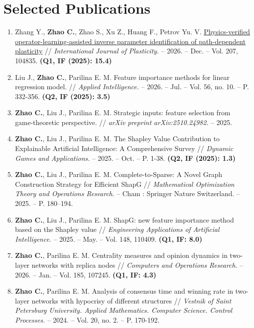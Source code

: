 \documentclass[letterpaper,10pt]{article}
\begin{document}
\section{Selected Publications}
\begin{enumerate}[itemsep=2pt,parsep=0pt]
  \fontsize{10}{10.5}\selectfont
  \item Zhang Y., \textbf{Zhao C.}, Zhao S., Xu Z., Huang F., Petrov Yu. V.
        \href{https://doi.org/10.1016/j.ijplas.2026.104835}{Physics-verified
        operator-learning-assisted inverse parameter identification of
        path-dependent plasticity} // {\it International Journal of
        Plasticity.} -- 2026. -- Dec. -- Vol. 207, 104835. {\bf (Q1, IF (2025):
        15.4)}
  \item Liu J., \textbf{Zhao C.}, Parilina E. M. Feature importance methods for
        linear regression model. // {\it Applied Intelligence.} -- 2026. --
        Jul. -- Vol. 56, no. 10. -- P. 332-356. {\bf (Q2, IF (2025): 3.5)}
  \item \textbf{Zhao C.}, Liu J., Parilina E. M. Strategic inputs: feature selection from game-theoretic perspective. // {\it arXiv preprint arXiv:2510.24982.} -- 2025.
  \item \textbf{Zhao C.}, Liu J., Parilina E. M. The Shapley Value Contribution to Explainable Artificial Intelligence: A Comprehensive Survey // {\it Dynamic Games and Applications.} -- 2025. -- Oct. -- P. 1-38. {\bf (Q2, IF (2025): 1.3)}
  \item \textbf{Zhao C.}, Liu J., Parilina E. M. Complete-to-Sparse: A Novel Graph Construction Strategy for Efficient ShapG // {\it Mathematical Optimization Theory and Operations Research}. -- Cham : Springer Nature Switzerland. -- 2025. -- P. 180–194.
  \item \textbf{Zhao C.}, Liu J., Parilina E. M. ShapG: new feature importance method based on the Shapley value // {\it Engineering Applications of Artificial Intelligence.} -- 2025. -- May. -- Vol. 148, 110409. {\bf (Q1, IF: 8.0)}
  \item \textbf{Zhao C.}, Parilina E. M. Centrality measures and opinion dynamics in two-layer networks with replica nodes // {\it Computers and Operations Research.} -- 2026. -- Jan. -- Vol. 185, 107245. {\bf (Q1, IF: 4.3)}
  \item \textbf{Zhao C.}, Parilina E. M. Analysis of consensus time and winning rate in two-layer networks with hypocrisy of different structures // {\it Vestnik of Saint Petersburg University. Applied Mathematics. Computer Science. Control Processes.} -- 2024. -- Vol. 20, no. 2. -- P. 170-192.

\end{enumerate}
\end{document}
